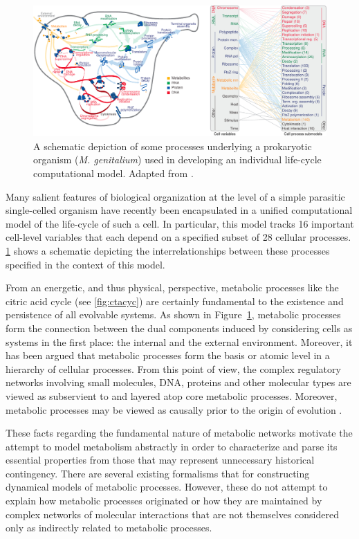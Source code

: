 \begin{figure}
\begin{center}
\noindent\includegraphics[width=0.95\columnwidth]{fig/cellprocessesdiagram.pdf}
\end{center}
\caption{A schematic depiction of some processes underlying a prokaryotic organism (\emph{M. genitalium}) used in developing an individual life-cycle computational model. Adapted from \cite{Karr2012}.}
\label{fig:cellprocess}
\end{figure}
Many salient features of biological organization at the level of a simple parasitic single-celled organism have recently been encapsulated in a unified computational model of the life-cycle of such a cell. In particular, this model tracks 16 important cell-level variables that each depend on a specified subset of 28 cellular processes. \ref{fig:cellprocess} shows a schematic depicting the interrelationships between these processes specified in the context of this model.

From an energetic, and thus physical, perspective, metabolic processes like the citric acid cycle (see \ref{fig:ctacyc}) are certainly fundamental to the existence and persistence of all evolvable systems. As shown in Figure~\ref{fig:cellprocess}, metabolic processes form the connection between the dual components induced by considering cells as systems in the first place: the internal and the external environment. Moreover, it has been argued that metabolic processes form the basis or atomic level in a hierarchy of cellular processes. From this point of view, the complex regulatory networks involving small molecules, DNA, proteins and other molecular types are viewed as subservient to and layered atop core metabolic processes. Moreover, metabolic processes may be viewed as causally prior to the origin of evolution \cite{Braakman2012,Braakman2012a}.

These facts regarding the fundamental nature of metabolic networks motivate the attempt to model metabolism abstractly in order to characterize and parse its essential properties from those that may represent unnecessary historical contingency. There are several existing formalisms that for constructing dynamical models of metabolic processes. However, these do not attempt to explain how metabolic processes originated or how they are maintained by complex networks of molecular interactions that are not themselves considered only as indirectly related to metabolic processes.


